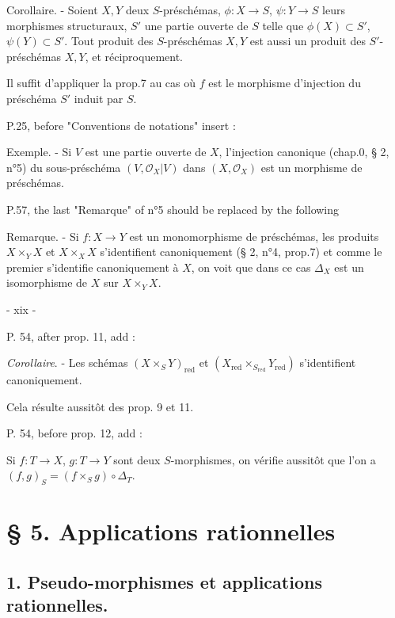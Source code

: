 Corollaire. - Soient $X, Y$ deux $S$-préschémas, $\phi : X \to S$, $\psi : Y \to S$ leurs morphismes structuraux, $S'$ une partie ouverte de $S$ telle que $\phi(X) \subset S'$, $\psi(Y) \subset S'$. Tout produit des $S$-préschémas $X, Y$ est aussi un produit des $S'$-préschémas $X, Y$, et réciproquement.

Il suffit d'appliquer la prop.7 au cas où $f$ est le morphisme d'injection du préschéma $S'$ induit par $S$.

P.25, before "Conventions de notations" insert :

Exemple. - Si $V$ est une partie ouverte de $X$, l'injection canonique (chap.0, § 2, n°5) du sous-préschéma $(V, \mathcal{O}_X|V)$ dans $(X, \mathcal{O}_X)$ est un morphisme de préschémas.

P.57, the last "Remarque" of n°5 should be replaced by the following

Remarque. - Si $f : X \to Y$ est un monomorphisme de préschémas, les produits $X \times_Y X$ et $X \times_X X$ s'identifient canoniquement (§ 2, n°4, prop.7) et comme le premier s'identifie canoniquement à $X$, on voit que dans ce cas $\Delta_X$ est un isomorphisme de $X$ sur $X \times_Y X$.

\newpage


- xix -

P. 54, after prop. 11, add :

\emph{Corollaire}. - Les schémas $(X \times_S Y)_{\text{red}}$ et $(X_{\text{red}} \times_{S_{\text{red}}} Y_{\text{red}})$ s'identifient canoniquement.

Cela résulte aussitôt des prop. 9 et 11.

P. 54, before prop. 12, add :

Si $f : T \to X$, $g : T \to Y$ sont deux $S$-morphismes, on vérifie aussitôt que l'on a $(f,g)_S = (f \times_S g) \circ \Delta_T$.

\newpage



\section*{§ 5. Applications rationnelles}

\subsection*{1. Pseudo-morphismes et applications rationnelles.}


